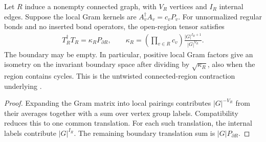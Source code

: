\begin{lemma}%
    \label{thm:peps_connected_regular_region_gram}
    \leanok
    Let $R$ induce a nonempty connected graph, with $V_R$ vertices
    and $I_R$ internal edges. Suppose the local Gram kernels are
    $A_v^\dagger A_v=c_vP_v$. For unnormalized regular bonds and
    no inserted bond operators, the open-region tensor satisfies
    \begin{align}
        T_R^\dagger T_R=\kappa_R P_{\partial R},\qquad
        \kappa_R=\left(\prod_{v\in R}c_v\right)
        \frac{|G|^{I_R+1}}{|G|^{V_R}}.
    \end{align}
    The boundary may be empty. In particular, positive local Gram
    factors give an isometry on the invariant boundary space after
    dividing by $\sqrt{\kappa_R}$, also when the region contains cycles.
    This is the untwisted connected-region contraction underlying
    \cite[Lemma~6.2 and proof of Theorem~6.9]{Schuch2010PEPS}.
\end{lemma}
\begin{proof}\leanok
    Expanding the Gram matrix into local pairings contributes
    $|G|^{-V_R}$ from their averages together with a sum over vertex group labels. Compatibility
    reduces this to one common translation. For each such translation,
    the internal labels contribute $|G|^{I_R}$. The remaining boundary
    translation sum is $|G|P_{\partial R}$.
\end{proof}

